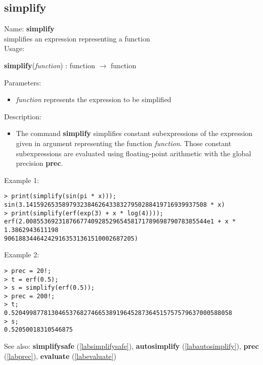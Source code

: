 \subsection{simplify}
\label{labsimplify}
\noindent Name: \textbf{simplify}\\
simplifies an expression representing a function\\
\noindent Usage: 
\begin{center}
\textbf{simplify}(\emph{function}) : \textsf{function} $\rightarrow$ \textsf{function}\\
\end{center}
Parameters: 
\begin{itemize}
\item \emph{function} represents the expression to be simplified
\end{itemize}
\noindent Description: \begin{itemize}

\item The command \textbf{simplify} simplifies constant subexpressions of the
   expression given in argument representing the function
   \emph{function}. Those constant subexpressions are evaluated using
   floating-point arithmetic with the global precision \textbf{prec}.
\end{itemize}
\noindent Example 1: 
\begin{center}\begin{minipage}{15cm}\begin{Verbatim}[frame=single]
> print(simplify(sin(pi * x)));
sin(3.14159265358979323846264338327950288419716939937508 * x)
> print(simplify(erf(exp(3) + x * log(4))));
erf(2.00855369231876677409285296545817178969879078385544e1 + x * 1.3862943611198
906188344642429163531361510002687205)
\end{Verbatim}
\end{minipage}\end{center}
\noindent Example 2: 
\begin{center}\begin{minipage}{15cm}\begin{Verbatim}[frame=single]
> prec = 20!;
> t = erf(0.5);
> s = simplify(erf(0.5));
> prec = 200!;
> t;
0.5204998778130465376827466538919645287364515757579637000588058
> s;
0.52050018310546875
\end{Verbatim}
\end{minipage}\end{center}
See also: \textbf{simplifysafe} (\ref{labsimplifysafe}), \textbf{autosimplify} (\ref{labautosimplify}), \textbf{prec} (\ref{labprec}), \textbf{evaluate} (\ref{labevaluate})
